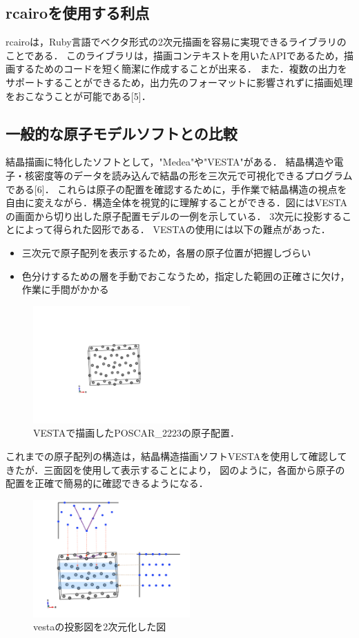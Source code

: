 \subsection{rcairoを使用する利点}
rcairoは，Ruby言語でベクタ形式の2次元描画を容易に実現できるライブラリのことである．
このライブラリは，描画コンテキストを用いたAPIであるため，描画するためのコードを短く簡潔に作成することが出来る．
また．複数の出力をサポートすることができるため，出力先のフォーマットに影響されずに描画処理をおこなうことが可能である[5]．

\subsection{一般的な原子モデルソフトとの比較}
結晶描画に特化したソフトとして，"Medea"や"VESTA"がある．
結晶構造や電子・核密度等のデータを読み込んで結晶の形を三次元で可視化できるプログラムである[6]．
これらは原子の配置を確認するために，手作業で結晶構造の視点を自由に変えながら．構造全体を視覚的に理解することができる．図にはVESTAの画面から切り出した原子配置モデルの一例を示している．
3次元に投影することによって得られた図形である．
VESTAの使用には以下の難点があった．

\begin{itemize}
\item 三次元で原子配列を表示するため，各層の原子位置が把握しづらい
\item 色分けするための層を手動でおこなうため，指定した範囲の正確さに欠け，作業に手間がかかる
\end{itemize}
\begin{figure}[htbp]\begin{center}
\includegraphics[width=6cm,bb=0 0 442 500]{../figs/./boundary_narita.006.jpg}
\caption{VESTAで描画したPOSCAR\_2223の原子配置．}
\label{default}\end{center}\end{figure}
これまでの原子配列の構造は，結晶構造描画ソフトVESTAを使用して確認してきたが．三面図を使用して表示することにより，
図のように，各面から原子の配置を正確で簡易的に確認できるようになる．

\begin{figure}[htbp]\begin{center}
\includegraphics[width=6cm,bb=0 0 442 500]{../figs/./boundary_narita.007.jpg}
\caption{vestaの投影図を2次元化した図}
\label{default}\end{center}\end{figure}
